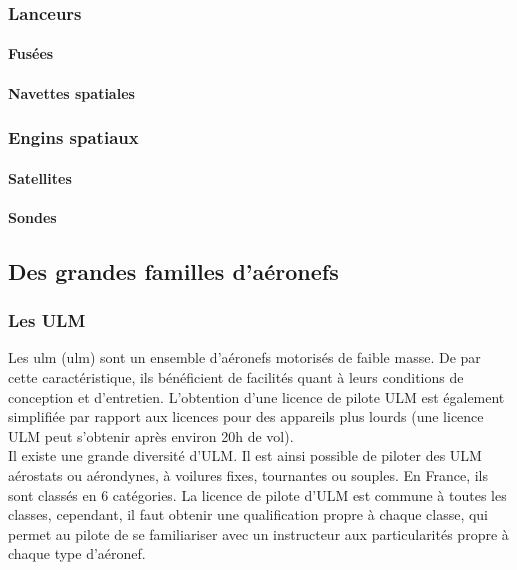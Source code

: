 	\subsubsection{Lanceurs}
		\paragraph{Fusées}
		\paragraph{Navettes spatiales}
		
	\subsubsection{Engins spatiaux}
		\paragraph{Satellites}
		\paragraph{Sondes}

\subsection{Des grandes familles d'aéronefs}		
\subsubsection{Les ULM}

Les \acrshort{ulm} (\acrlong{ulm})  sont un ensemble d'aéronefs motorisés de faible masse. De par cette caractéristique, ils bénéficient de facilités quant à leurs conditions de conception et d'entretien. L'obtention d'une licence de pilote ULM est également simplifiée par rapport aux licences pour des appareils plus lourds (une licence ULM peut s'obtenir après environ 20h de vol). \\

Il existe une grande diversité d'ULM. Il est ainsi possible de piloter des ULM aérostats ou aérondynes, à voilures fixes, tournantes ou souples. En France, ils sont classés en 6 catégories. La licence de pilote d'ULM est commune à toutes les classes, cependant, il faut obtenir une qualification propre à chaque classe, qui permet au pilote de se familiariser avec un instructeur aux particularités propre à chaque type d'aéronef. \\

